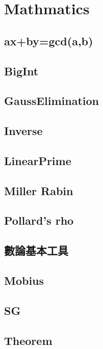 \section{Mathmatics}

\subsection{ax+by=gcd(a,b)}

\subsection{BigInt}

\subsection{GaussElimination}

\subsection{Inverse}

\subsection{LinearPrime}

\subsection{Miller Rabin}

\subsection{Pollard's rho}

\subsection{數論基本工具}

\subsection{Mobius}

\subsection{SG}

\subsection{Theorem}



